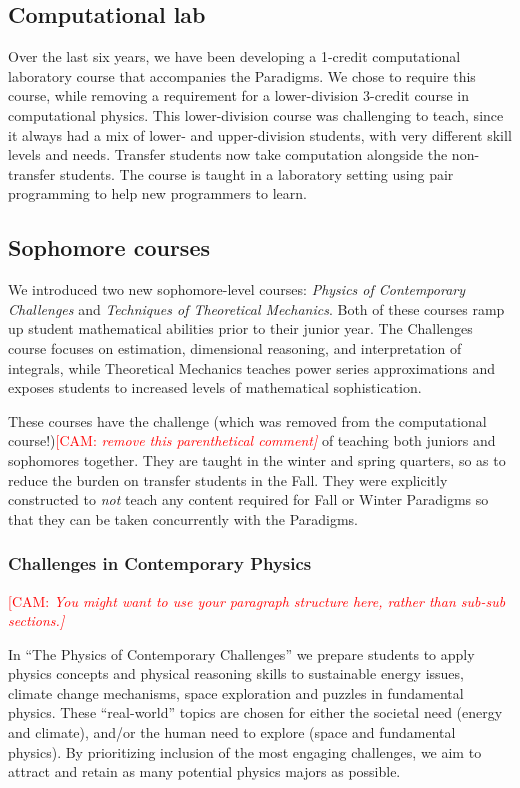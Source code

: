 \documentclass[english,aps,pra,reprint,noshowpacs,superscriptaddress]{revtex4-1}
\newcommand\corinnesays[1]{\textcolor{red}{[\sc CAM: \em{#1}]}}
\begin{document}
\subsection{Computational lab}
Over the last six years, we have been developing a 1-credit
computational laboratory course that accompanies the Paradigms.  We
chose to require this course, while removing a requirement for a
lower-division 3-credit course in computational physics.  This
lower-division course was challenging to teach, since it always had a
mix of lower- and upper-division students, with very different skill
levels and needs.  Transfer students now take computation alongside
the non-transfer students. The course is taught in a laboratory setting using pair
programming to help new programmers to learn.

\subsection{Sophomore courses}
We introduced two new sophomore-level courses: \emph{Physics of
Contemporary Challenges} and \emph{Techniques of Theoretical Mechanics}.  Both of
these courses ramp up student mathematical abilities prior to their
junior year.  The Challenges course focuses on estimation,
dimensional reasoning, and interpretation of integrals, while
Theoretical Mechanics teaches power series approximations and
exposes students to increased levels of mathematical sophistication.

These courses have the challenge (which was removed from
the computational course!)\corinnesays{remove this parenthetical comment} 
of teaching both juniors and sophomores
together.  They are taught in the winter and spring quarters, so
as to reduce the burden on transfer students in the Fall.  They were
explicitly constructed to \emph{not} teach any content required for
Fall or Winter Paradigms so that they can be taken concurrently with
the Paradigms.

\subsubsection{Challenges in Contemporary Physics}
\corinnesays{You might want to use your paragraph structure here, rather than sub-sub sections.}

In ``The Physics of Contemporary Challenges'' we prepare students to
apply physics concepts and physical reasoning skills to sustainable
energy issues, climate change mechanisms, space exploration and
puzzles in fundamental physics. These ``real-world'' topics are chosen
for either the societal need (energy and climate), and/or the human
need to explore (space and fundamental physics). By prioritizing
inclusion of the most engaging challenges, we aim to attract and
retain as many potential physics majors as possible.
\end{document}
